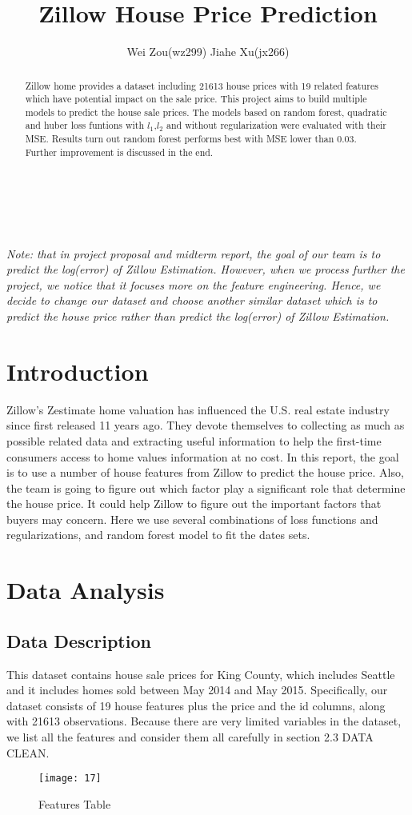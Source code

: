 \documentclass[12pt,twocolumn,twoside]{article}
\begin{document}
\lipsum[0]
\title{Zillow House Price Prediction}\\
\author{Wei Zou(wz299) Jiahe Xu(jx266)}
\maketitle\\
\textit{Note: that in project proposal and midterm report, the goal of our team is to predict the log(error) of Zillow Estimation. However, when we process further the project, we notice that it focuses more on the feature engineering. Hence, we decide to change our dataset and choose another similar dataset which is to predict the house price rather than predict the log(error) of Zillow Estimation.}

\begin{abstract}
Zillow home provides a dataset including 21613 house prices with 19 related features which have potential impact on the sale price. This project aims to build multiple models to predict the house sale prices. The models based on random forest, quadratic and huber loss funtions with $l_1$,$l_2$ and without regularization were evaluated with their MSE. Results turn out random forest performs best with MSE lower than 0.03. Further improvement is discussed in the end.
\end{abstract}
\section{Introduction}
Zillow's Zestimate home valuation has influenced the U.S. real estate industry since first released 11 years ago. 
They devote themselves to collecting as much as possible related data and extracting useful information to help the first-time consumers access to home values information at no cost. 
In this report, the goal is to use a number of house features from Zillow to predict the house price. Also, the team is going to figure out which factor play a significant role that determine the house price. It could help Zillow to figure out the important factors that buyers may concern. Here we use several combinations of loss functions and regularizations, and random forest model to fit the dates sets. 
\section{Data Analysis}
\subsection{Data Description}
This dataset contains house sale prices for King County, which includes Seattle and it includes homes sold between May 2014 and May 2015. Specifically, our dataset consists of 19 house features plus the price and the id columns, along with 21613 observations. Because there are very limited variables in the dataset, we list all the features and consider them all carefully in section 2.3 DATA CLEAN.
\begin{figure}[h]
\texttt{[image: 17]}
\caption{Features Table}
\end{figure}
\end{document}
